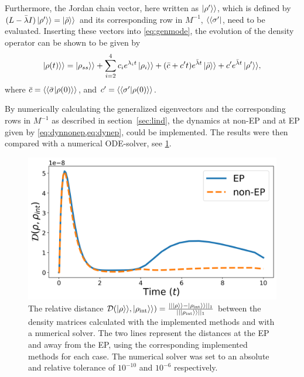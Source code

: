 \documentclass[../main.tex]{subfiles}
\begin{document}
Furthermore, the Jordan chain vector, here written as $\ket{\rho'}\rangle$, which is defined by $(L - \bar\lambda I)\ket{\rho'}\rangle = \ket{\bar\rho}\rangle$ and its corresponding row in $M^{-1}$, $\langle\bra{\sigma'}$, need to be evaluated. Inserting these vectors into \cref{eq:genmode}, the evolution of the density operator can be shown to be given by
\begin{equation}\label{eq:dynep}
    \begin{aligned}
        \ket{\rho(t)}\rangle = \ket{\rho_{ss}}\rangle + \sum_{i=2}^4 c_i e^{\lambda_i t} \ket{\rho_i}\rangle  
                                + (\bar c + c't)e^{\bar \lambda t}\ket{\bar \rho}\rangle + c'e^{\bar\lambda t}\ket{\rho'}\rangle,
    \end{aligned}
\end{equation}
where $\bar c = \langle\braket{\bar\sigma|\rho(0)}\rangle$, and $c' = \langle\braket{\sigma'|\rho(0)}\rangle$.

By numerically calculating the generalized eigenvectors and the corresponding rows in $M^{-1}$ as described in section~\ref{sec:lind}, the dynamics at non-EP and at EP given by \cref{eq:dynnonep,eq:dynep}, could be implemented. The results were then compared with a numerical ODE-solver, see \cref{fig:minevsint}.

\begin{figure}[H]
    \centering
    \includegraphics[width=0.7\linewidth]{figures/minevsint.png}
    \caption{The relative distance $\mathcal{D}(\ket{\rho}\rangle, \ket{\rho_\text{int}}\rangle) = \frac{||\ket{\rho}\rangle - \ket{\rho_\text{int}}\rangle||_1}{||\ket{\rho_\text{int}}\rangle||_1}$ between the density matrices calculated with the implemented methods and with a numerical solver. The two lines represent the distances at the EP and away from the EP, using the corresponding implemented methods for each case. The numerical solver was set to an absolute and relative tolerance of $10^{-10}$ and $10^{-6}$ respectively.}
    \label{fig:minevsint}
\end{figure}
\end{document}
